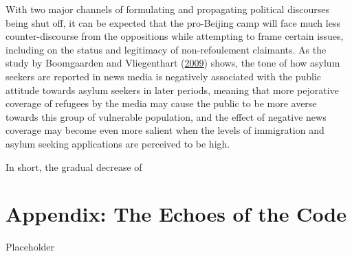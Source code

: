 \documentclass[a4paper, oneside]{report}
\begin{document}
With two major channels of formulating and propagating political
discourses being shut off, it can be expected that the pro-Beijing camp
will face much less counter-discourse from the oppositions while
attempting to frame certain issues, including on the status and
legitimacy of non-refoulement claimants. As the study by Boomgaarden and
Vliegenthart
(\protect\hyperlink{ref-boomgaardenHowNewsContent2009}{2009}) shows, the
tone of how asylum seekers are reported in news media is negatively
associated with the public attitude towards asylum seekers in later
periods, meaning that more pejorative coverage of refugees by the media
may cause the public to be more averse towards this group of vulnerable
population, and the effect of negative news coverage may become even
more salient when the levels of immigration and asylum seeking
applications are perceived to be high.

In short, the gradual decrease of

\hypertarget{appendix-the-echoes-of-the-code}{%
\chapter*{Appendix: The Echoes of the
Code}\label{appendix-the-echoes-of-the-code}}

Placeholder

\end{document}
